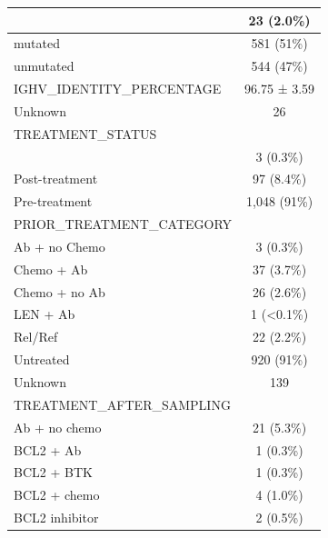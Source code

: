 \documentclass[
]{article}
\begin{document}
\begin{longtable}{l|c}
\hline
\hspace{1em} & 23 (2.0\%)\\
\hline
\hspace{1em}mutated & 581 (51\%)\\
\hline
\hspace{1em}unmutated & 544 (47\%)\\
\hline
IGHV\_IDENTITY\_PERCENTAGE & 96.75 ± 3.59\\
\hline
\hspace{1em}Unknown & 26\\
\hline
TREATMENT\_STATUS & \\
\hline
\hspace{1em} & 3 (0.3\%)\\
\hline
\hspace{1em}Post-treatment & 97 (8.4\%)\\
\hline
\hspace{1em}Pre-treatment & 1,048 (91\%)\\
\hline
PRIOR\_TREATMENT\_CATEGORY & \\
\hline
\hspace{1em}Ab + no Chemo & 3 (0.3\%)\\
\hline
\hspace{1em}Chemo + Ab & 37 (3.7\%)\\
\hline
\hspace{1em}Chemo + no Ab & 26 (2.6\%)\\
\hline
\hspace{1em}LEN + Ab & 1 (<0.1\%)\\
\hline
\hspace{1em}Rel/Ref & 22 (2.2\%)\\
\hline
\hspace{1em}Untreated & 920 (91\%)\\
\hline
\hspace{1em}Unknown & \vphantom{3} 139\\
\hline
TREATMENT\_AFTER\_SAMPLING & \\
\hline
\hspace{1em}Ab + no chemo & 21 (5.3\%)\\
\hline
\hspace{1em}BCL2 + Ab & 1 (0.3\%)\\
\hline
\hspace{1em}BCL2 + BTK & 1 (0.3\%)\\
\hline
\hspace{1em}BCL2 + chemo & 4 (1.0\%)\\
\hline
\hspace{1em}BCL2 inhibitor & 2 (0.5\%)\\

\end{longtable}
\end{document}
